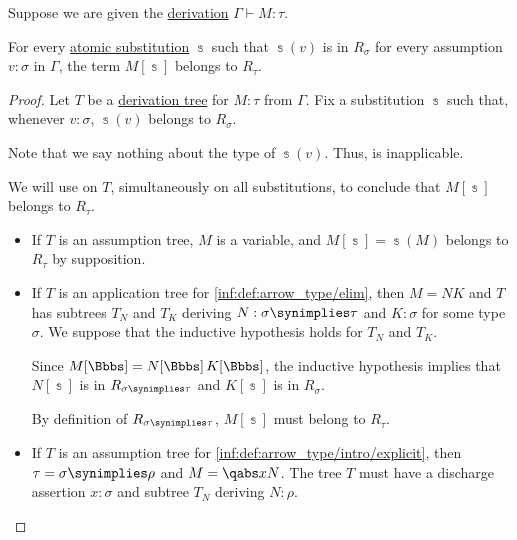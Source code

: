 \begin{lemma}\label{thm:reducibility_candidate_substitution}
  Suppose we are given the \hyperref[def:simple_type_derivation]{derivation} \( \Gamma \vdash M: \tau \).

  For every \hyperref[def:atomic_lambda_term_substitution]{atomic substitution} \( \Bbbs \) such that \( \Bbbs(v) \) is in \( R_\sigma \) for every assumption \( v: \sigma \) in \( \Gamma \), the term \( M[\Bbbs] \) belongs to \( R_\tau \).
\end{lemma}
\begin{proof}
  Let \( T \) be a \hyperref[def:type_derivation_tree]{derivation tree} for \( M: \tau \) from \( \Gamma \). Fix a substitution \( \Bbbs \) such that, whenever \( v: \sigma \), \( \Bbbs(v) \) belongs to \( R_\sigma \).

  Note that we say nothing about the type of \( \Bbbs(v) \). Thus,  is inapplicable.

  We will use  on \( T \), simultaneously on all substitutions, to conclude that \( M[\Bbbs] \) belongs to \( R_\tau \).
  \begin{itemize}
    \item If \( T \) is an assumption tree, \( M \) is a variable, and \( M[\Bbbs] = \Bbbs(M) \) belongs to \( R_\tau \) by supposition.

    \item If \( T \) is an application tree for \ref{inf:def:arrow_type/elim}, then \( M = NK \) and \( T \) has subtrees \( T_N \) and \( T_K \) deriving \( N: \sigma \synimplies \tau \) and \( K: \sigma \) for some type \( \sigma \). We suppose that the inductive hypothesis holds for \( T_N \) and \( T_K \).

    Since \( M[\Bbbs] = N[\Bbbs] \thinspace K[\Bbbs] \), the inductive hypothesis implies that \( N[\Bbbs] \) is in \( R_{\sigma \synimplies \tau} \) and \( K[\Bbbs] \) is in \( R_\sigma \).

    By definition of \( R_{\sigma \synimplies \tau} \), \( M[\Bbbs] \) must belong to \( R_\tau \).

    \item If \( T \) is an assumption tree for \ref{inf:def:arrow_type/intro/explicit}, then \( \tau = \sigma \synimplies \rho \) and \( M = \qabs x N \). The tree \( T \) must have a discharge assertion \( x: \sigma \) and subtree \( T_N \) deriving \( N: \rho \).


\end{itemize}
\end{proof}
